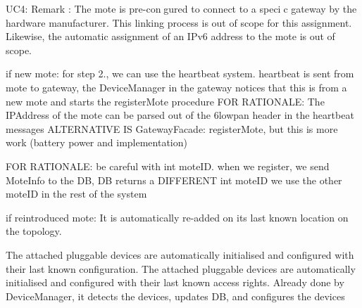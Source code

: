         UC4:
            Remark : The mote is pre-congured to connect to a specic gateway by
             the hardware manufacturer. This linking process is out of scope for
             this assignment. Likewise, the automatic assignment of an IPv6 address
             to the mote is out of scope.

            if new mote:
                for step 2., we can use the heartbeat system. heartbeat is sent from mote to gateway,
                the DeviceManager in the gateway notices that this is from a new mote and starts
                the registerMote procedure
                FOR RATIONALE: The IPAddress of the mote can be parsed out of the 6lowpan header in the heartbeat messages
                ALTERNATIVE IS GatewayFacade: registerMote, but this is more work (battery power and implementation)

                FOR RATIONALE: be careful with int moteID. when we register, we send MoteInfo to the DB, DB returns a DIFFERENT int moteID
                               we use the other moteID in the rest of the system

        if reintroduced mote:
            It is automatically re-added on its last known location on the topology.

            The attached pluggable devices are automatically initialised and configured with their last known configuration.
            The attached pluggable devices are automatically initialised and configured with their last known access rights.
                Already done by DeviceManager, it detects the devices, updates DB, and configures the devices


